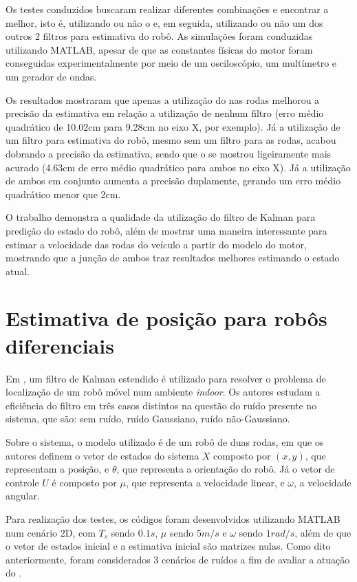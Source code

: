 \documentclass[acronym, symbols, table, deposito]{fei}
\begin{document}
Os testes conduzidos buscaram realizar diferentes combinações e encontrar a melhor, isto é, utilizando ou não o  e, em seguida, utilizando ou não um dos outros 2 filtros para estimativa do robô. As simulações foram conduzidas utilizando MATLAB, apesar de que as constantes físicas do motor foram conseguidas experimentalmente por meio de um osciloscópio, um multímetro e um gerador de ondas.

Os resultados mostraram que apenas a utilização do  nas rodas melhorou a precisão da estimativa em relação a utilização de nenhum filtro (erro médio quadrático de 10.02cm para 9.28cm no eixo X, por exemplo). Já a utilização de um filtro para estimativa do robô, mesmo sem um filtro para as rodas, acabou dobrando a precisão da estimativa, sendo que o  se mostrou ligeiramente mais acurado (4.63cm de erro médio quadrático para ambos no eixo X). Já a utilização de ambos em conjunto aumenta a precisão duplamente, gerando um erro médio quadrático menor que 2cm.

O trabalho demonstra a qualidade da utilização do filtro de Kalman para predição do estado do robô, além de mostrar uma maneira interessante para estimar a velocidade das rodas do veículo a partir do modelo do motor, mostrando que a junção de ambos traz resultados melhores estimando o estado atual.


\section{Estimativa de posição para robôs diferenciais}

Em \textcite{eman2020mobile}, um filtro de Kalman estendido é utilizado para resolver o problema de localização de um robô móvel num ambiente \textit{indoor}. Os autores estudam a eficiência do filtro em três casos distintos na questão do ruído presente no sistema, que são: sem ruído, ruído Gaussiano, ruído não-Gaussiano.

Sobre o sistema, o modelo utilizado é de um robô de duas rodas, em que os autores definem o vetor de estados do sistema $X$ composto por $(x, y)$, que representam a posição, e $\theta$, que representa a orientação do robô. Já o vetor de controle $U$ é composto por $\mu$, que representa a velocidade linear, e $\omega$, a velocidade angular.

Para realização dos testes, os códigos foram desenvolvidos utilizando MATLAB num cenário 2D, com $T_s$ sendo $0.1s$, $\mu$ sendo $5m/s$ e $\omega$ sendo $1rad/s$, além de que o vetor de estados inicial e a estimativa inicial são matrizes nulas. Como dito anteriormente, foram considerados 3 cenários de ruídos a fim de avaliar a atuação do .
\end{document}
